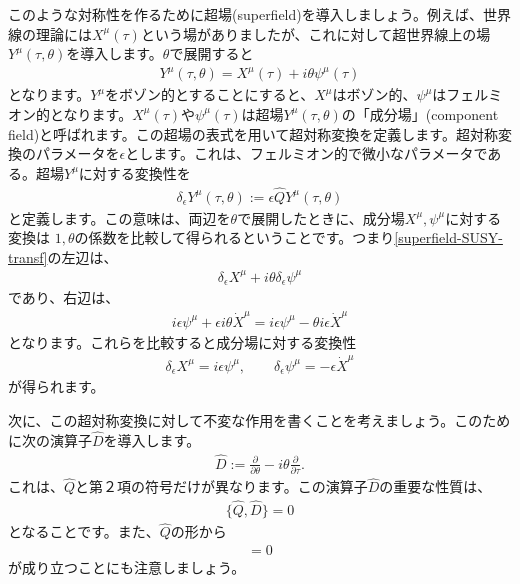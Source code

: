 \documentclass[report,paper=a4, fontsize=12pt, line_length=16cm, number_of_lines=33,dvipdfmx]{jlreq}
\numberwithin{equation}{chapter}
\numberwithin{equation}{section}
\newcommand{\del}{\partial}
\newcommand{\deldel}[2]{\frac{\del {#1}}{\del {#2}}}
\newcommand{\Qh}{\widehat{Q}}
\newcommand{\Dh}{\widehat{D}}
\begin{document}
このような対称性を作るために超場(superfield)を導入しましょう。例えば、世界線の理論には$X^{\mu}(\tau)$という場がありましたが、これに対して超世界線上の場$Y^{\mu}(\tau,\theta)$を導入します。$\theta$で展開すると
\begin{align}
Y^{\mu}(\tau,\theta)=X^{\mu}(\tau) + i\theta \psi^{\mu}(\tau)
\end{align}
となります。$Y^{\mu}$をボゾン的とすることにすると、$X^{\mu}$はボゾン的、$\psi^{\mu}$はフェルミオン的となります。$X^{\mu}(\tau)$や$\psi^{\mu}(\tau)$は超場$Y^{\mu}(\tau,\theta)$の「成分場」(component field)と呼ばれます。この超場の表式を用いて超対称変換を定義します。超対称変換のパラメータを$\epsilon$とします。これは、フェルミオン的で微小なパラメータである。超場$Y^{\mu}$に対する変換性を
\begin{align}
\delta_{\epsilon} Y^{\mu}(\tau,\theta) := \epsilon \Qh Y^{\mu}(\tau,\theta)
\label{superfield-SUSY-transf}
\end{align}
と定義します。この意味は、両辺を$\theta$で展開したときに、成分場$X^{\mu},\psi^{\mu}$に対する変換は
$1, \theta$の係数を比較して得られるということです。つまり\eqref{superfield-SUSY-transf}の左辺は、
\begin{align}
\delta_{\epsilon}X^{\mu} + i\theta \delta_{\epsilon} \psi^{\mu}
\end{align}
であり、右辺は、
\begin{align}
i\epsilon \psi^{\mu} +\epsilon i\theta \dot{X}^{\mu}
=i\epsilon \psi^{\mu} -\theta i\epsilon \dot{X}^{\mu}
\end{align}
となります。これらを比較すると成分場に対する変換性
\begin{align}
\delta_{\epsilon} X^{\mu}=i\epsilon \psi^{\mu},\qquad
\delta_{\epsilon} \psi^{\mu}=-\epsilon \dot{X}^{\mu}
\end{align}
が得られます。

次に、この超対称変換に対して不変な作用を書くことを考えましょう。このために次の演算子$\Dh$を導入します。
\begin{align}
\Dh:=\deldel{}{\theta}-i\theta\deldel{}{\tau}.
\end{align}
これは、$\Qh$と第２項の符号だけが異なります。この演算子$\Dh$の重要な性質は、
\begin{align}
\{\Qh,\Dh\}=0 \label{com-Q-D}
\end{align}
となることです。また、$\Qh$の形から
\begin{align}
[\del_{\tau},\Qh]=0\label{com-deltau-Q}
\end{align}
が成り立つことにも注意しましょう。
\end{document}
